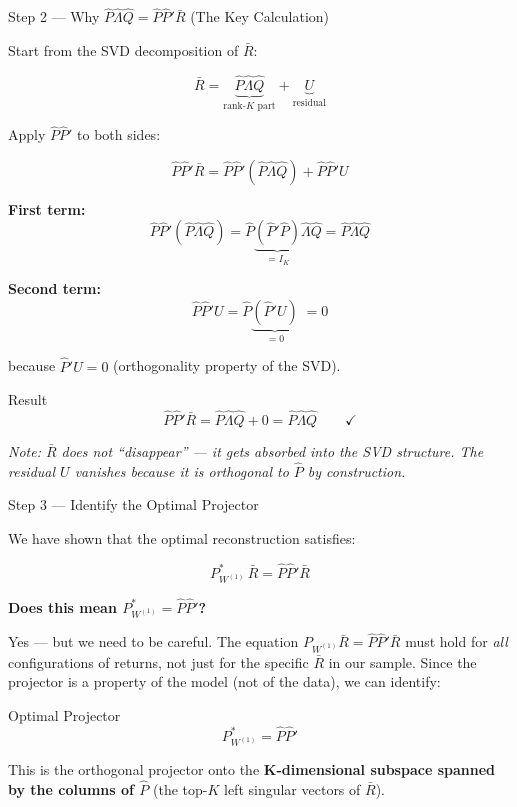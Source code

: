 \documentclass[aspectratio=169, 10pt]{beamer}
\newcommand{\Rbar}{\bar{R}}
\newcommand{\Phat}{\hat{P}}
\newcommand{\Lhat}{\hat{\Lambda}}
\newcommand{\Qhat}{\hat{Q}}
\newcommand{\Pw}{P_{W^{(1)}}}
\begin{document}
\begin{frame}{Step 2 — Why $\Phat\Lhat\Qhat = \Phat\Phat'\Rbar$ (The Key Calculation)}

Start from the SVD decomposition of $\Rbar$:

$$\Rbar = \underbrace{\Phat\Lhat\Qhat}_{\text{rank-}K\text{ part}} + \underbrace{U}_{\text{residual}}$$

Apply $\Phat\Phat'$ to both sides:

$$\Phat\Phat'\Rbar = \Phat\Phat'(\Phat\Lhat\Qhat) + \Phat\Phat' U$$

\medskip
\textbf{First term:}
$$\Phat\Phat'(\Phat\Lhat\Qhat) = \Phat\underbrace{(\Phat'\Phat)}_{= I_K}\Lhat\Qhat = \Phat\Lhat\Qhat$$

\textbf{Second term:}
$$\Phat\Phat' U = \Phat\underbrace{(\Phat' U)}_{= 0}\;= 0$$

because $\Phat' U = 0$ (orthogonality property of the SVD).

\medskip
\begin{exampleblock}{Result}
$$\Phat\Phat'\Rbar = \Phat\Lhat\Qhat + 0 = \Phat\Lhat\Qhat \qquad \checkmark$$
\end{exampleblock}

\medskip
\small \textit{Note: $\bar{R}$ does not ``disappear'' — it gets absorbed into the SVD structure.
The residual $U$ vanishes because it is orthogonal to $\hat P$ by construction.}

\end{frame}

\begin{frame}{Step 3 — Identify the Optimal Projector}

We have shown that the optimal reconstruction satisfies:

$$\Pw^*\,\Rbar = \Phat\Phat'\Rbar$$

\bigskip
\textbf{Does this mean $\Pw^* = \Phat\Phat'$?}

\medskip
Yes — but we need to be careful. The equation $\Pw\Rbar = \Phat\Phat'\Rbar$ must
hold for \emph{all} configurations of returns, not just for the specific $\Rbar$ in
our sample. Since the projector is a property of the model (not of the data), we can
identify:

\begin{block}{Optimal Projector}
$$\Pw^* = \Phat\Phat'$$
\end{block}

\medskip
This is the orthogonal projector onto the \textbf{K-dimensional subspace spanned by
the columns of $\Phat$} (the top-$K$ left singular vectors of $\Rbar$).

\end{frame}
\end{document}
